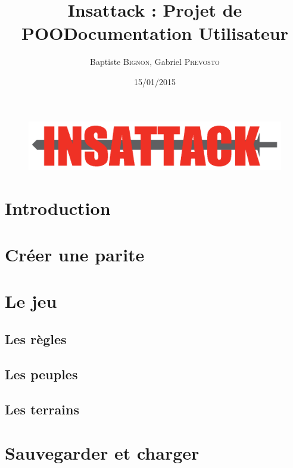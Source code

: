 \documentclass[12pt]{article}
\title{Insattack : Projet de POO\smallbreak Documentation Utilisateur}
\author{Baptiste \textsc{Bignon}, Gabriel \textsc{Prevosto}}
\date{15/01/2015}
\begin{document}
\maketitle
\vfill %

\begin{figure}[!h]
\centering
\includegraphics[width=\textwidth]{Parties/Images/Logo}
\label{fig:logo}
\end{figure}

\vfill
\vfill
\newpage

\tableofcontents
\renewcommand{\contentsname}{Sommaire}
\newpage


\section{Introduction}			\label{sec:introduction}			
\newpage

\section{Créer une parite}			\label{sec:creation_partie}			
\clearpage

\section{Le jeu}				\label{sec:jeu}
\subsection{Les règles}			\label{sec:regles}				
\subsection{Les peuples}			\label{sec:départements}			
\subsection{Les terrains}			\label{sec:terrains}				
\clearpage

\section{Sauvegarder et charger}	\label{sec:sauvegarde_chargement}	
\clearpage

\end{document}

